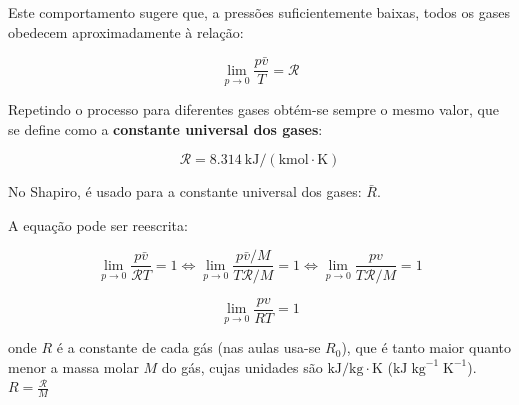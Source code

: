 Este comportamento sugere que, a pressões suficientemente baixas, todos os gases obedecem aproximadamente à relação:


\begin{equation}
    \lim_{p \to 0} \frac{p \bar{v}}{T} = \mathcal{R}
\end{equation}

Repetindo o processo para diferentes gases obtém-se sempre o mesmo valor, que se define como a \textbf{constante universal dos gases}:

\begin{equation}
    \mathcal{R} = 8.314~\text{kJ}/(\text{kmol}\cdot\text{K})
\end{equation}

No Shapiro, é usado para a constante universal dos gases: $\bar{R}$. 

A equação pode ser reescrita:

\begin{equation}
    \lim_{p \to 0} \frac{p \bar{v}}{\mathcal{R} T} = 1 \Longleftrightarrow \lim_{p \to 0} \frac{p \bar{v}/M}{T \mathcal{R} /M} = 1 \Longleftrightarrow \lim_{p \to 0} \frac{p v}{T \mathcal{R} / M} = 1
\end{equation}

\begin{equation}
    \lim_{p \to 0} \frac{p v}{R T} = 1
\end{equation}

onde $R$ é a constante de cada gás (nas aulas usa-se $R_0$), que é tanto maior quanto menor a massa molar $M$ do gás, cujas unidades são $\text{kJ}/\text{kg}\cdot\text{K}$ ($\text{kJ} \; \text{kg}^{-1} \; \text{K}^{-1}$). $R = \frac{\mathcal{R}}{M}$


